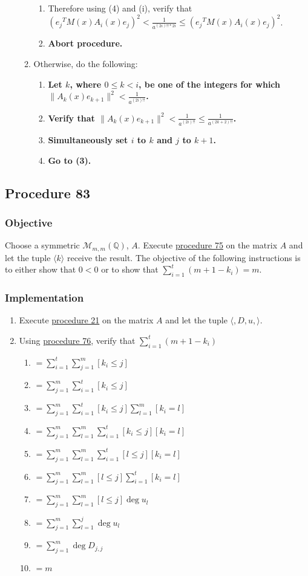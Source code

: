 \documentclass[twocolumn]{article}
\newcommand{\procedure}[2][]{\subsection*{Procedure #2 \ifthenelse{\equal{#1}{}}{}{(#1)}}\label{sec:procedure #2}}
\newcommand{\objective}{\subsubsection*{Objective}}
\newcommand{\implementation}{\subsubsection*{Implementation}}
\begin{document}
\begin{enumerate}
\begin{enumerate}
\begin{enumerate}
							\item Therefore using (4) and (i), verify that $({e_j}^TM(x)A_i(x)e_j)^2<\frac{1}{a^{(2i)!!*2i}}\le ({e_j}^TM(x)A_i(x)e_j)^2$.
							\item \textbf{Abort procedure.}
						\end{enumerate}
						\item Otherwise, do the following:
						\begin{enumerate}
							\item \textbf{Let $k$, where $0\le k<i$, be one of the integers for which $\lVert A_k(x)e_{k+1}\rVert^2<\frac{1}{a^{(2i)!!}}$.}
							\item \textbf{Verify that $\lVert A_k(x)e_{k+1}\rVert^2<\frac{1}{a^{(2i)!!}}\le\frac{1}{a^{(2k+2)!!}}$.}
							\item \textbf{Simultaneously set $i$ to $k$ and $j$ to $k+1$.}
							\item \textbf{Go to (3).}
						\end{enumerate}
					\end{enumerate}
				\end{enumerate}
		\procedure{83}
			\objective
				Choose a symmetric $\mathcal{M}_{m,m}(\mathbb{Q})$, $A$. Execute \hyperref[sec:procedure 75]{procedure 75} on the matrix $A$ and let the tuple $\langle k\rangle$ receive the result. The objective of the following instructions is to either show that $0<0$ or to show that $\sum_{i=1}^t(m+1-k_i)=m$.
			\implementation
				\begin{enumerate}
					\item Execute \hyperref[sec:procedure 21]{procedure 21} on the matrix $A$ and let the tuple $\langle,D,u,\rangle$.
					\item Using \hyperref[sec:procedure 76]{procedure 76}, verify that $\sum_{i=1}^t(m+1-k_i)$
					\begin{enumerate}
						\item $=\sum_{i=1}^t\sum_{j=1}^m [k_i\le j]$
						\item $=\sum_{j=1}^m\sum_{i=1}^t [k_i\le j]$
						\item $=\sum_{j=1}^m\sum_{i=1}^t [k_i\le j]\sum_{l=1}^m [k_i=l]$
						\item $=\sum_{j=1}^m\sum_{l=1}^m\sum_{i=1}^t [k_i\le j][k_i=l]$
						\item $=\sum_{j=1}^m\sum_{l=1}^m\sum_{i=1}^t [l\le j][k_i=l]$
						\item $=\sum_{j=1}^m\sum_{l=1}^m [l\le j]\sum_{i=1}^t [k_i=l]$
						\item $=\sum_{j=1}^m\sum_{l=1}^m [l\le j]\deg u_l$
						\item $=\sum_{j=1}^m\sum_{l=1}^j \deg u_l$
						\item $=\sum_{j=1}^m \deg D_{j,j}$
						\item $=m$
					\end{enumerate}
				\end{enumerate}
\end{document}

